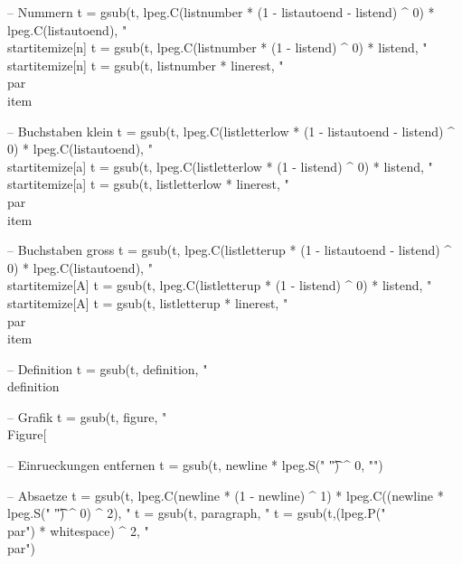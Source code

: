 {{{{{{{{{{      -- Nummern
    t = gsub(t, lpeg.C(listnumber * (1 - listautoend - listend) ^ 0) * lpeg.C(listautoend), "\n\n\\startitemize[n]\n%
    t = gsub(t, lpeg.C(listnumber * (1 - listend) ^ 0) * listend, "\n\n\\startitemize[n]\n%
    t = gsub(t, listnumber * linerest, "\n\\par\\item %
    
      -- Buchstaben klein
    t = gsub(t, lpeg.C(listletterlow * (1 - listautoend - listend) ^ 0) * lpeg.C(listautoend), "\n\n\\startitemize[a]\n%
    t = gsub(t, lpeg.C(listletterlow * (1 - listend) ^ 0) * listend, "\n\n\\startitemize[a]\n%
    t = gsub(t, listletterlow * linerest, "\n\\par\\item %
    
      -- Buchstaben gross
    t = gsub(t, lpeg.C(listletterup * (1 - listautoend - listend) ^ 0) * lpeg.C(listautoend), "\n\n\\startitemize[A]\n%
    t = gsub(t, lpeg.C(listletterup * (1 - listend) ^ 0) * listend, "\n\n\\startitemize[A]\n%
    t = gsub(t, listletterup * linerest, "\n\\par\\item %
    
    -- Definition
    t = gsub(t, definition, "\n\n\\definition{%
    
    -- Grafik
    t = gsub(t, figure, "\n\\Figure[%
    
    -- Einrueckungen entfernen
    t = gsub(t, newline * lpeg.S(" \t") ^ 0, "\n")
    
    -- Absaetze
    t = gsub(t, lpeg.C(newline * (1 - newline) ^ 1) * lpeg.C((newline * lpeg.S(" \t") ^ 0) ^ 2), "%
    t = gsub(t, paragraph, "%
    t = gsub(t,(lpeg.P("\\par") * whitespace) ^ 2, "\\par\n")
    
}}}}}}}}}}}
